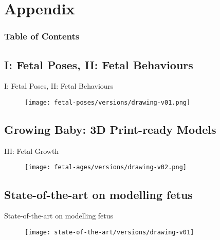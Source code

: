 \section{Appendix}

\begin{frame}
  \frametitle{Table of Contents}
  \tableofcontents[currentsection]
\end{frame}


\subsection{I: Fetal Poses, II: Fetal Behaviours}

{
\begin{frame}{I: Fetal Poses, II: Fetal Behaviours}
      \begin{figure}
        \centering
        \texttt{[image: fetal-poses/versions/drawing-v01.png]}
      \end{figure}
\end{frame}
}

\subsection{Growing Baby: 3D Print-ready Models}


{
\begin{frame}{III: Fetal Growth}
      \begin{figure}
        \centering
        \texttt{[image: fetal-ages/versions/drawing-v02.png]}
      \end{figure}
\end{frame}
}


\subsection{State-of-the-art on modelling fetus}

{
\begin{frame}{State-of-the-art on modelling fetus}
      \begin{figure}
        \centering
        \texttt{[image: state-of-the-art/versions/drawing-v01]}
      \end{figure}
\end{frame}
}





